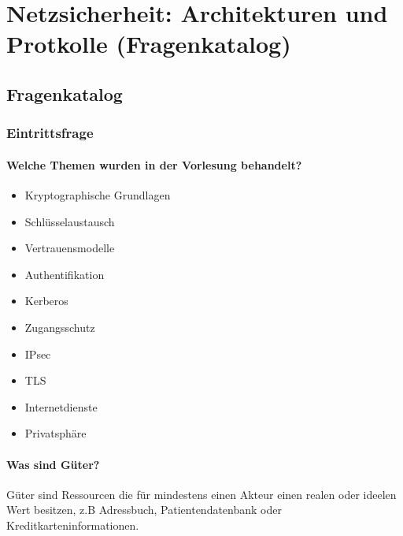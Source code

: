 \chapter{Netzsicherheit: Architekturen und Protkolle (Fragenkatalog)}

\section{Fragenkatalog}
\subsection{Eintrittsfrage}
	\subsubsection{Welche Themen wurden in der Vorlesung behandelt?}
		\begin{itemize}
			\item{Kryptographische Grundlagen}
			\item{Schlüsselaustausch}
			\item{Vertrauensmodelle}
			\item{Authentifikation}
			\item{Kerberos}
			\item{Zugangsschutz}
			\item{IPsec}
			\item{TLS}
			\item{Internetdienste}
			\item{Privatsphäre}
		\end{itemize}
		
	\subsubsection{Was sind Güter?}
	Güter sind Ressourcen die für mindestens einen Akteur einen realen oder ideelen Wert besitzen, z.B Adressbuch, Patientendatenbank oder Kreditkarteninformationen.
	
